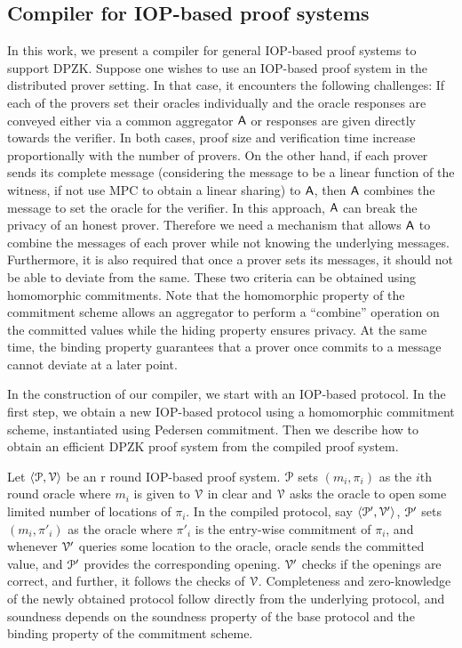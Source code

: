 \subsection{Compiler for IOP-based proof systems}
In this work, we present a compiler for general IOP-based proof systems to support DPZK. Suppose one wishes to use an IOP-based proof system in the distributed prover setting. In that case, it encounters the following challenges: If each of the provers set their oracles individually and the oracle responses are conveyed either via a common aggregator $\mathsf{A}$ or responses are given directly towards the verifier. In both cases, proof size and verification time increase proportionally with the number of provers. On the other hand, if each prover sends its complete message (considering the message to be a linear function of the witness, if not use MPC to obtain a linear sharing) to $\mathsf{A}$, then $\mathsf{A}$ combines the message to set the oracle for the verifier. In this approach, $\mathsf{A}$ can break the privacy of an honest prover. Therefore we need a mechanism that allows $\mathsf{A}$ to combine the messages of each prover while not knowing the underlying messages.
Furthermore, it is also required that once a prover sets its messages, it should not be able to deviate from the same. These two criteria can be obtained using homomorphic commitments. Note that the homomorphic property of the commitment scheme allows an aggregator to perform a ``combine'' operation on the committed values while the hiding property ensures privacy. At the same time, the binding property guarantees that a prover once commits to a message cannot deviate at a later point.

In the construction of our compiler, we start with an IOP-based protocol. In the first step, we obtain a new IOP-based protocol using a homomorphic commitment scheme, instantiated using Pedersen commitment. Then we describe how to obtain an efficient DPZK proof system from the compiled proof system.

Let $\langle \mathcal{P},\mathcal{V}\rangle$ be an r round IOP-based proof system. $\mathcal{P}$ sets $(m_i, \pi_i)$ as the $i$th round oracle where $m_i$ is given to $\mathcal{V}$ in clear and $\mathcal{V}$ asks the oracle to open some limited number of locations of $\pi_i$. In the compiled protocol, say $\langle \mathcal{P}',\mathcal{V}'\rangle$, $\mathcal{P}'$ sets $(m_i, \pi'_i)$ as the oracle where $\pi'_i$ is the entry-wise commitment of $\pi_i$, and whenever $\mathcal{V}'$ queries some location to the oracle, oracle sends the committed value, and $\mathcal{P}'$ provides the corresponding opening. $\mathcal{V}'$ checks if the openings are correct, and further, it follows the checks of $\mathcal{V}$. Completeness and zero-knowledge of the newly obtained protocol follow directly from the underlying protocol, and soundness depends on the soundness property of the base protocol and the binding property of the commitment scheme. 

